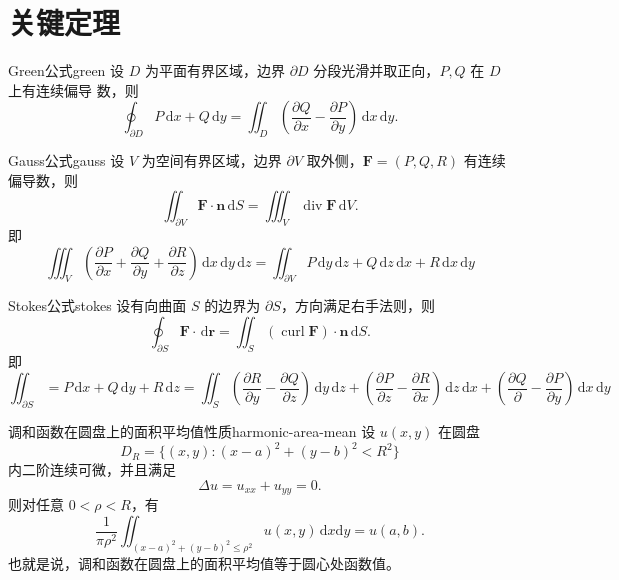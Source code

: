 \documentclass[UTF8,zihao=-4,openany]{ctexbook}
\newcommand{\dd}{\,\mathrm{d}}
\newcommand{\diver}{\operatorname{div}}
\newcommand{\curl}{\operatorname{curl}}
\begin{document}
\section{关键定理}
\begin{theorem}{Green公式}{green}
设 $D$ 为平面有界区域，边界 $\partial D$ 分段光滑并取正向，$P,Q$ 在 $D$ 上有连续偏导                                                             数，则
\[
\oint_{\partial D}P\dd x+Q\dd y=\iint_D\left(\frac{\partial Q}{\partial x}-\frac{\partial P}{\partial y}\right)\dd x\dd y.
\]
\end{theorem}

\begin{theorem}{Gauss公式}{gauss}
设 $V$ 为空间有界区域，边界 $\partial V$ 取外侧，$\bm F=(P,Q,R)$ 有连续偏导数，则
\[
\iint_{\partial V}\bm F\cdot\bm n\dd S=\iiint_V\diver\bm F\dd V.
\]即\[
\iiint_{V}(\frac{\partial P}{\partial x}+\frac{\partial Q}{\partial y}+\frac{\partial R}{\partial z})\dd x\dd y\dd z=\iint_{\partial V}P\dd y\dd z+Q\dd z\dd x+R\dd x\dd y
\]
\end{theorem}

\begin{theorem}{Stokes公式}{stokes}
设有向曲面 $S$ 的边界为 $\partial S$，方向满足右手法则，则
\[
\oint_{\partial S}\bm F\cdot\dd\bm r=\iint_S(\curl\bm F)\cdot\bm n\dd S.
\]即\[
\iint_{\partial S}=P\dd x+Q\dd y+R\dd z=\iint_{S}(\frac{\partial R}{\partial y}-\frac{\partial Q}{\partial z})\dd y\dd z+(\frac{\partial P}{\partial z}-\frac{\partial R}{\partial x})\dd z\dd x+(\frac{\partial Q}{\partial }-\frac{\partial P}{\partial y})\dd x\dd y
\]
\end{theorem}

\begin{theorem}{调和函数在圆盘上的面积平均值性质}{harmonic-area-mean}
设 $u(x,y)$ 在圆盘
\[
  D_R=\{(x,y):(x-a)^2+(y-b)^2<R^2\}
\]
内二阶连续可微，并且满足
\[
  \Delta u=u_{xx}+u_{yy}=0.
\]
则对任意 $0<\rho<R$，有
\[
  \frac{1}{\pi\rho^2}
  \iint_{(x-a)^2+(y-b)^2\leq \rho^2}u(x,y)\,\mathrm{d}x\mathrm{d}y
  =
  u(a,b).
\]
也就是说，调和函数在圆盘上的面积平均值等于圆心处函数值。
\end{theorem}
\end{document}
